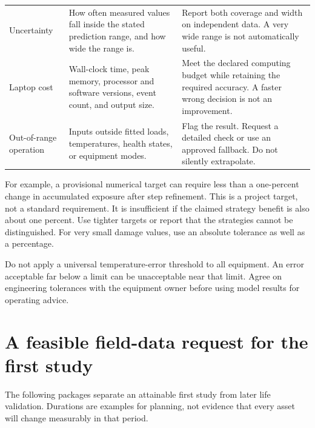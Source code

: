 \documentclass[11pt,a4paper]{report}
\begin{document}
\begin{longtable}{L{0.19\textwidth}L{0.34\textwidth}L{0.35\textwidth}}
Uncertainty & How often measured values fall inside the stated prediction range, and how wide the range is. & Report both coverage and width on independent data. A very wide range is not automatically useful. \\
Laptop cost & Wall-clock time, peak memory, processor and software versions, event count, and output size. & Meet the declared computing budget while retaining the required accuracy. A faster wrong decision is not an improvement. \\
Out-of-range operation & Inputs outside fitted loads, temperatures, health states, or equipment modes. & Flag the result. Request a detailed check or use an approved fallback. Do not silently extrapolate. \\
\bottomrule
\end{longtable}

For example, a provisional numerical target can require less than a one-percent change in accumulated exposure after step refinement.
This is a project target, not a standard requirement.
It is insufficient if the claimed strategy benefit is also about one percent.
Use tighter targets or report that the strategies cannot be distinguished.
For very small damage values, use an absolute tolerance as well as a percentage.

Do not apply a universal temperature-error threshold to all equipment.
An error acceptable far below a limit can be unacceptable near that limit.
Agree on engineering tolerances with the equipment owner before using model results for operating advice.

\section{A feasible field-data request for the first study}
The following packages separate an attainable first study from later life validation.
Durations are examples for planning, not evidence that every asset will change measurably in that period.
\end{document}
